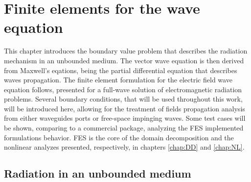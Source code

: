 \graphicspath{{img/ch1/}}
\chapter{Finite elements for the wave equation} \label{chap:FE}

\par This chapter introduces the boundary value problem that describes the radiation mechanism in an unbounded medium. The vector wave equation is then derived from Maxwell's eqations, being the partial differential equation that describes waves propagation. The finite element formulation for the electric field wave equation follows, presented for a full-wave solution of electromagnetic radiation problems. Several boundary conditions, that will be used throughout this work, will be introduced here, allowing for the treatment of fields propagation analysis from either waveguides ports or free-space impinging waves. Some test cases will be shown, comparing to a commercial package, analyzing the FES implemented formulations behavior. FES is the core of the domain decomposition and the nonlinear analyzes presented, respectively, in chapters \ref{chap:DD} and \ref{chap:NL}.


\section{Radiation in an unbounded medium}

